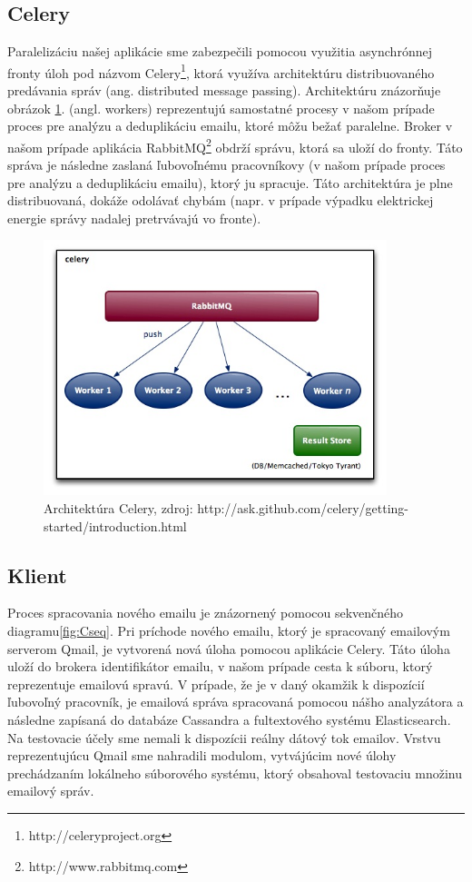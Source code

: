 \documentclass[11pt,twoside,a4paper]{book}
\begin{document}
\subsection*{Celery}
Paralelizáciu našej aplikácie sme zabezpečili pomocou využitia asynchrónnej fronty úloh pod názvom Celery\footnote{http://celeryproject.org}, ktorá využíva architektúru distribuovaného predávania správ (ang. distributed message passing). Architektúru znázorňuje obrázok \ref{fig:Celery}.  (angl. workers) reprezentujú samostatné procesy v našom prípade proces pre analýzu a deduplikáciu emailu, ktoré môžu bežať paralelne. Broker v našom prípade aplikácia RabbitMQ\footnote{http://www.rabbitmq.com} obdrží správu, ktorá sa uloží do fronty. Táto správa je následne zaslaná ľubovoľnému pracovníkovy (v našom prípade proces pre analýzu a deduplikáciu emailu), ktorý ju spracuje. Táto architektúra je plne distribuovaná, dokáže odolávať chybám (napr. v prípade výpadku elektrickej energie správy nadalej pretrvávajú vo fronte). 

\begin{figure}[h]
 \centering
 \includegraphics[width=10cm]{./figures/Celery.jpg}
 \caption{Architektúra Celery, zdroj: http://ask.github.com/celery/getting-started/introduction.html}
 \label{fig:Celery}
\end{figure}


\subsection{Klient}

Proces spracovania nového emailu je znázornený pomocou sekvenčného diagramu\ref{fig:Cseq}. Pri príchode nového emailu, ktorý je spracovaný emailovým serverom Qmail, je vytvorená nová úloha pomocou aplikácie Celery. Táto úloha uloží do brokera identifikátor emailu, v našom prípade cesta k súboru, ktorý reprezentuje emailovú spravú. V prípade, že je v daný okamžik k dispozícií ľubovoľný pracovník, je emailová správa spracovaná pomocou nášho analyzátora a následne zapísaná do databáze Cassandra a fultextového systému Elasticsearch. Na testovacie účely sme nemali k dispozícii reálny dátový tok emailov. Vrstvu reprezentujúcu Qmail sme nahradili modulom, vytvájúcim nové úlohy prechádzaním lokálneho súborového systému, ktorý obsahoval testovaciu množinu emailový správ.
\end{document}
